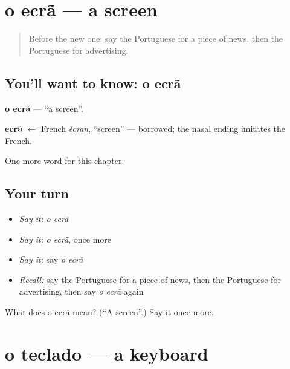 \section[o ecrã]{o ecrã — a screen}

\label{lesson:PT-C245-ecra}



\begin{quote}
Before the new one: say the Portuguese for a piece of news, then the Portuguese for advertising.
\end{quote}

\subsection*{You'll want to know: o ecrã}
\textbf{o ecrã} — \textquotedblleft{}a screen\textquotedblright{}.

\begin{cousinweb}
\textbf{ecrã} $\leftarrow$ French \emph{écran}, \textquotedblleft{}screen\textquotedblright{} — borrowed; the nasal ending imitates the French.
\end{cousinweb}

\begin{grammarlens}[title={What you've built}]
One more word for this chapter.
\end{grammarlens}

\subsection*{Your turn}
\begin{itemize}
\raggedright
  \item \emph{Say it:} \emph{o ecrã}
  \item \emph{Say it:} \emph{o ecrã}, once more
  \item \emph{Say it:} say \emph{o ecrã}
  \item \emph{Recall:} say the Portuguese for a piece of news, then the Portuguese for advertising, then say \emph{o ecrã} again
\end{itemize}

\begin{tcolorbox}[breakable,colback=teal!4,colframe=teal!35!black,title={Before you move on}]
What does o ecrã mean? (\textquotedblleft{}A screen\textquotedblright{}.) Say it once more.
\end{tcolorbox}
\section[o teclado]{o teclado — a keyboard}

